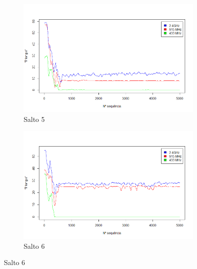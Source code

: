 \documentclass[
	12pt,				%
	openright,			%
	oneside,
	a4paper,			%
	english,			%
	french,				%
	spanish,			%
	brazil				%
	]{abntex2}
\begin{document}
\begin{figure}[ht]\ContinuedFloat		
	\begin{subfigure}{.5\textwidth}
		\centering
		\includegraphics[width=.98\linewidth]{TRNG_Salto5}
		\captionsetup{width=.9\textwidth}
		\caption{Salto 5}
		\label{trng_no_opt_s5}
	\end{subfigure}%
	\begin{subfigure}{.5\textwidth}
		\centering
		\includegraphics[width=.98\linewidth]{TRNG_Salto6}
		\captionsetup{width=.9\textwidth}
		\caption{Salto 6}
		\label{trng_no_opt_s6}
	\end{subfigure}
\end{figure}
\end{document}
